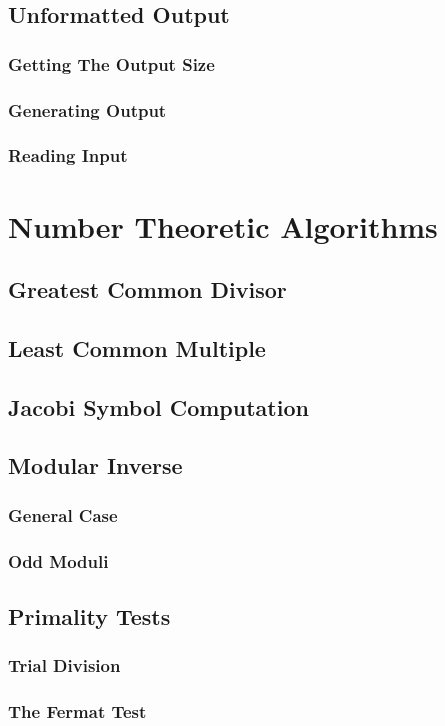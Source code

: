 \documentclass[b5paper]{book}
\begin{document}
\section{Unformatted Output}
\subsection{Getting The Output Size}
\subsection{Generating Output}
\subsection{Reading Input}

\chapter{Number Theoretic Algorithms}
\section{Greatest Common Divisor}
\section{Least Common Multiple}
\section{Jacobi Symbol Computation}
\section{Modular Inverse}
\subsection{General Case}
\subsection{Odd Moduli}
\section{Primality Tests}
\subsection{Trial Division}
\subsection{The Fermat Test}
\end{document}
